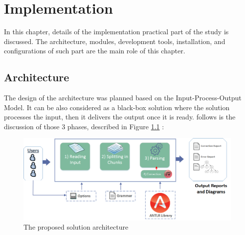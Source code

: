 \chapter{Implementation}
\label{ch:implementation}


In this chapter, details of the implementation practical part of the study is discussed. The architecture, modules, development tools, installation, and configurations of such part are the main role of this chapter.  
 
\section {Architecture}
The design of the architecture was planned based on the Input-Process-Output Model. It can be also considered as a black-box solution where the solution processes the input, then it delivers the output once it is ready. follows is the discussion of those 3 phases, described in Figure \ref{Fig:Architecture} : 
 \begin{figure}[H]
	\begin{center}
		\includegraphics[scale=0.5]{images/Architecture}
		\setlength\belowcaptionskip{-7mm}
		\caption{The proposed solution architecture}
		\label{Fig:Architecture}
	\end{center}
\end{figure}

